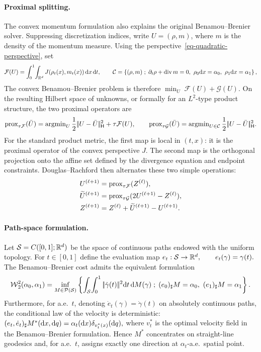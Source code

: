 \paragraph{Proximal splitting.}
The convex momentum formulation also explains the original Benamou--Brenier solver. Suppressing discretization indices, write \(U=(\rho,m)\), where \(m\) is the density of the momentum measure. Using the perspective~\eqref{eq-quadratic-perspective}, set
\[
\mathcal F(U)=\int_0^1\!\int_{\mathbb{R}^d}J(\rho_t(x),m_t(x))\,\mathrm{d} x\,\mathrm{d} t,
\qquad
\mathcal C=\left\{ (\rho,m) \;;\; \partial_t\rho+\operatorname{div} m=0,\ \rho_0\mathrm{d} x=\alpha_0,\ \rho_1\mathrm{d} x=\alpha_1 \right\},
\]
The convex Benamou--Brenier problem is therefore
\(\min_U\; \mathcal F(U)+\mathcal G(U).\)
On the resulting Hilbert space of unknowns, or formally for an $L^2$-type product structure, the two proximal operators are
\[
\operatorname{prox}_{\tau\mathcal F}(\bar U)
=
\operatorname{argmin}_U
\frac12|\!| U-\bar U |\!|_{\mathsf H}^2+\tau\mathcal F(U),
\qquad
\operatorname{prox}_{\tau\mathcal G}(\bar U)
=
\operatorname{argmin}_{U\in\mathcal C}
\frac12|\!| U-\bar U |\!|_{\mathsf H}^2.
\]
For the standard product metric, the first map is local in $(t,x)$: it is the proximal operator of the convex perspective $J$. The second map is the orthogonal projection onto the affine set defined by the divergence equation and endpoint constraints. Douglas--Rachford then alternates these two simple operations:
\[
\begin{aligned}
U^{(\ell+1)} &= \operatorname{prox}_{\tau\mathcal F}(Z^{(\ell)}),\\
\widetilde U^{(\ell+1)} &= \operatorname{prox}_{\tau\mathcal G}(2U^{(\ell+1)}-Z^{(\ell)}),\\
Z^{(\ell+1)} &= Z^{(\ell)}+\widetilde U^{(\ell+1)}-U^{(\ell+1)}.
\end{aligned}
\]
\paragraph{Path-space formulation.}\label{rem-bb-path-space}
Let $\mathcal{S}=C([0,1];\mathbb{R}^d)$ be the space of continuous paths endowed with the uniform topology. For $t\in[0,1]$ define the evaluation map
\(e_t:\mathcal{S}\to\mathbb{R}^d, \qquad e_t(\gamma)=\gamma(t).\)
The Benamou--Brenier cost admits the equivalent formulation
\[
\operatorname{\mathcal{W}}_2^2(\alpha_0,\alpha_1)
=
\inf_{M\in\mathcal{P}(\mathcal{S})}
\left\{ 
\int_{\mathcal{S}}\!\int_0^1|\!| \dot\gamma(t) |\!|^2\mathrm{d} t\,\mathrm{d} M(\gamma)
 \;;\; 
(e_0)_\sharp M=\alpha_0,\ (e_1)_\sharp M=\alpha_1
 \right\}.
\]
Furthermore, for a.e.\ $t$, denoting $\dot e_t(\gamma)=\dot\gamma(t)$ on absolutely continuous paths, the conditional law of the velocity is deterministic:
\((e_t,\dot e_t)_\sharp M^*(\mathrm{d} x,\mathrm{d} q) = \alpha_t(\mathrm{d} x)\delta_{v_t^*(x)}(\mathrm{d} q),\)
where $v_t^*$ is the optimal velocity field in the Benamou--Brenier formulation. Hence $M^*$ concentrates on straight-line geodesics and, for a.e.\ $t$, assigns exactly one direction at $\alpha_t$-a.e.\ spatial point.

